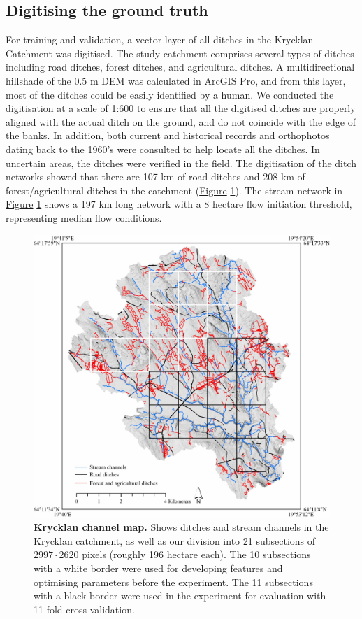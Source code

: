 \documentclass[11pt, review]{elsarticle} %
\begin{document}
\subsection{Digitising the ground truth}
For training and validation, a vector layer of all ditches in the Krycklan Catchment \citep{krycklancatchment} was digitised. The study catchment comprises several types of ditches including road ditches, forest ditches, and agricultural ditches. A multidirectional hillshade of the 0.5 m DEM was calculated in ArcGIS Pro, and from this layer, most of the ditches could be easily identified by a human. We conducted the digitisation at a scale of 1:600 to ensure that all the digitised ditches are properly aligned with the actual ditch on the ground, and do not coincide with the edge of the banks. In addition, both current and historical records and orthophotos dating back to the 1960's were consulted to help locate all the ditches. In uncertain areas, the ditches were verified in the field. The digitisation of the ditch networks showed that there are 107 km of road ditches and 208 km of forest/agricultural ditches in the catchment (\hyperref[fig:swedenkrycklan]{Figure} \ref{fig:swedenkrycklan}). The stream network in \hyperref[fig:swedenkrycklan]{Figure} \ref{fig:swedenkrycklan} shows a 197 km long network with a 8 hectare flow initiation threshold, representing median flow conditions.

\begin{figure}[!htb]
    \centering
    \includegraphics[width=1\linewidth]{./images/Krycklan_lo.jpg}
    \caption{\textbf{Krycklan channel map.} Shows ditches and stream channels in the Krycklan catchment, as well as our division into 21 subsections of $2997 \cdot 2620$ pixels (roughly 196 hectare each). The 10 subsections with a white border were used for developing features and optimising parameters before the experiment. The 11 subsections with a black border were used in the experiment for evaluation with 11-fold cross validation.}
    \label{fig:swedenkrycklan}
\end{figure}
\end{document}
